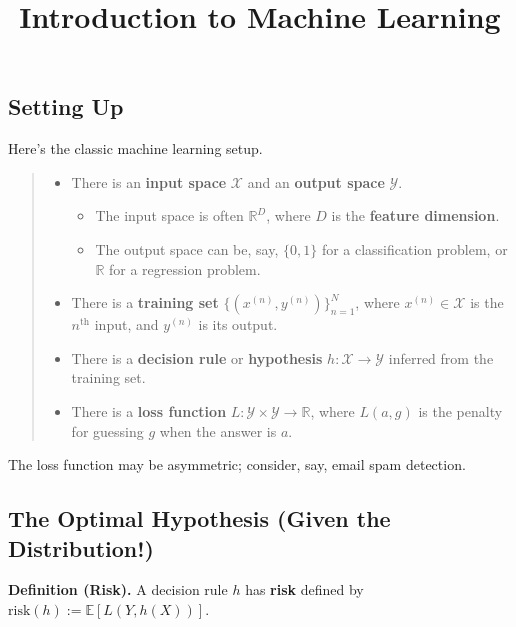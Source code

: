 \title{Introduction to Machine Learning}



\subsection{Setting Up}

Here's the classic machine learning setup.

\begin{quote}
    \begin{itemize}
        \item There is an \textbf{input space} $\mathcal{X}$ and
        an \textbf{output space} $\mathcal{Y}$.
        \begin{itemize}
            \item The input space is often $\mathbb{R}^D$,
            where $D$ is the \textbf{feature dimension}.
            \item The output space can be, say, $\{0, 1\}$ for a classification problem,
            or $\mathbb{R}$ for a regression problem.
        \end{itemize}
        \item There is a \textbf{training set} $\{(x^{(n)}, y^{(n)})\}_{n = 1}^N$,
        where $x^{(n)} \in \mathcal{X}$ is the $n^{\text{th}}$ input, and $y^{(n)}$ is its output.
        \item There is a \textbf{decision rule} or \textbf{hypothesis}
        $h: \mathcal{X} \to \mathcal{Y}$ inferred from the training set.
        \item There is a \textbf{loss function} $L: \mathcal{Y} \times \mathcal{Y} \to \mathbb{R}$,
        where $L(a, g)$ is the penalty for guessing $g$ when the answer is $a$.
    \end{itemize}
\end{quote}

\begin{remark}
    The loss function may be asymmetric; consider, say, email spam detection.
\end{remark}

\subsection{The Optimal Hypothesis (Given the Distribution!)}

\textbf{Definition (Risk).} A decision rule $h$ has \textbf{risk} defined by
$\mathrm{risk}(h) := \mathbb{E}[L(Y, h(X))]$.

